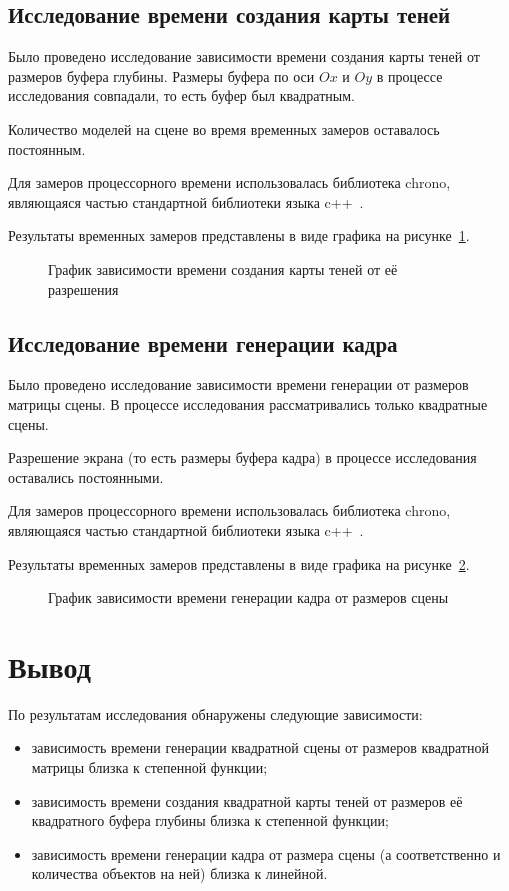 \subsection*{Исследование времени создания карты теней}

Было проведено исследование зависимости времени создания карты теней от размеров буфера глубины. Размеры буфера по оси $Ox$ и $Oy$ в процессе исследования совпадали, то есть буфер был квадратным.

Количество моделей на сцене во время временных замеров оставалось постоянным.

Для замеров процессорного времени использовалась библиотека chrono, являющаяся частью стандартной библиотеки языка c++~\cite{cpp}.

Результаты временных замеров представлены в виде графика на рисунке~\ref{fig:smap_graph}.

\begin{figure}[h!]
  \centering
  
  \caption{График зависимости времени создания карты теней от её разрешения}
  \label{fig:smap_graph}
\end{figure}

\subsection*{Исследование времени генерации кадра}

Было проведено исследование зависимости времени генерации от размеров матрицы сцены. В процессе исследования рассматривались только квадратные сцены.

Разрешение экрана (то есть размеры буфера кадра) в процессе исследования оставались постоянными.

Для замеров процессорного времени использовалась библиотека chrono, являющаяся частью стандартной библиотеки языка c++~\cite{cpp}.

Результаты временных замеров представлены в виде графика на рисунке~\ref{fig:render_graph}.

\begin{figure}[h!]
  \centering
  
  \caption{График зависимости времени генерации кадра от размеров сцены}
  \label{fig:render_graph}
\end{figure}

\newpage

\section{Вывод}

По результатам исследования обнаружены следующие зависимости:
\begin{itemize}
  \item зависимость времени генерации квадратной сцены от размеров квадратной матрицы близка к степенной функции; 
  \item зависимость времени создания квадратной карты теней от размеров её квадратного буфера глубины близка к степенной функции;
  \item зависимость времени генерации кадра от размера сцены (а соответственно и количества объектов на ней) близка к линейной.
\end{itemize}

